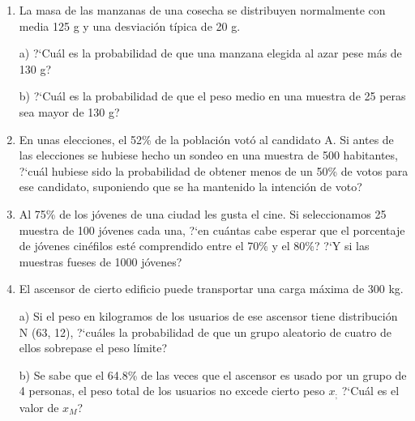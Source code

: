 \begin{adjustwidth}{20pt}{10pt}
\begin{enumerate}[PB. 1. ]
			
	\item 	La masa de las manzanas de una cosecha se distribuyen normalmente con media 125 g y una desviación típica de 20 g.
	
a) ?`Cuál es la probabilidad de que una manzana elegida al azar pese más de 130 g?

b) ?`Cuál es la probabilidad de que el peso medio en una muestra de 25 peras sea mayor de 130 g?

		
		\hspace{-1cm}\vspace{1cm}
		
	\item 	En unas elecciones, el 52\% de la población votó al candidato A. Si antes de las elecciones se hubiese hecho un sondeo en una muestra de 500 habitantes, ?`cuál hubiese sido la probabilidad de obtener menos de un 50\% de votos para ese candidato, suponiendo que se ha mantenido la intención de voto?
		
		\hspace{-1cm}\vspace{1cm}
		
	\item 	Al 75\% de los jóvenes de una ciudad les gusta el cine. Si seleccionamos 25 muestra de 100 jóvenes cada una, ?`en cuántas cabe esperar que el porcentaje de jóvenes cinéfilos esté comprendido entre el 70\% y el 80\%? ?`Y si las muestras fueses de 1000 jóvenes?
		
		\hspace{-1cm}\vspace{1cm}
		
			
	\item 	 El ascensor de cierto edificio puede transportar una carga máxima de 300 kg.

a) Si el peso en kilogramos de los usuarios de ese ascensor tiene distribución N (63, 12), ?`cuáles la probabilidad de que un grupo aleatorio de cuatro de ellos sobrepase el peso límite?

b) Se sabe que el 64.8\% de las veces que el ascensor es usado por un grupo de 4 personas, el peso total de los usuarios no excede cierto peso $x_;$ ?`Cuál es el valor de $x_M$?
		
		\hspace{-1cm}\vspace{1cm}
		

\end{enumerate}
\end{adjustwidth}
